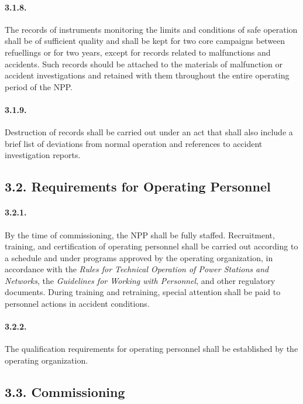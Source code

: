 \documentclass[openright]{bookest}
\begin{document}
\paragraph{3.1.8.}
The records of instruments monitoring the limits and conditions of safe operation shall be of sufficient quality and shall be kept for two core campaigns between refuellings or for two years, except for records related to malfunctions and accidents.  
Such records should be attached to the materials of malfunction or accident investigations and retained with them throughout the entire operating period of the NPP.

\paragraph{3.1.9.}
Destruction of records shall be carried out under an act that shall also include a brief list of deviations from normal operation and references to accident investigation reports.

\subsection*{3.2. Requirements for Operating Personnel}

\paragraph{3.2.1.}
By the time of commissioning, the NPP shall be fully staffed.  
Recruitment, training, and certification of operating personnel shall be carried out according to a schedule and under programs approved by the operating organization, in accordance with the \textit{Rules for Technical Operation of Power Stations and Networks}, the \textit{Guidelines for Working with Personnel}, and other regulatory documents.  
During training and retraining, special attention shall be paid to personnel actions in accident conditions.

\paragraph{3.2.2.}
The qualification requirements for operating personnel shall be established by the operating organization.

\subsection*{3.3. Commissioning}
\end{document}
